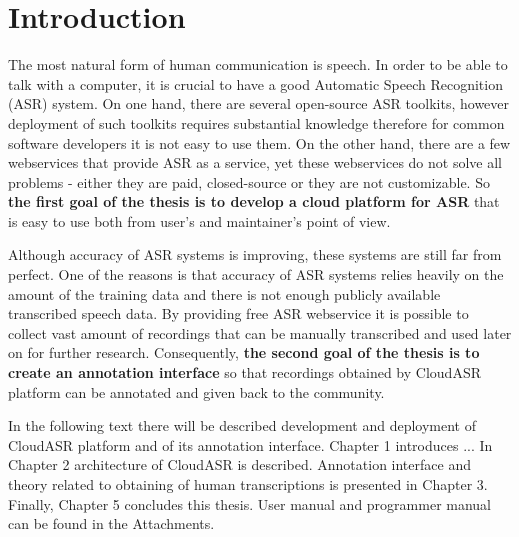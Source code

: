 \chapter*{Introduction}

The most natural form of human communication is speech.
In order to be able to talk with a computer,
  it is crucial to have a good Automatic Speech Recognition (ASR) system.
On one hand, there are several open-source ASR toolkits,
  however deployment of such toolkits requires substantial knowledge therefore
  for common software developers it is not easy to use them.
On the other hand, there are a few webservices that provide ASR as a service,
  yet these webservices do not solve all problems -
  either they are paid, closed-source or they are not customizable.
So \textbf{the first goal of the thesis is to develop a cloud platform for ASR}
  that is easy to use both from user's and maintainer's point of view.

Although accuracy of ASR systems is improving,
  these systems are still far from perfect.
One of the reasons is that accuracy of ASR systems relies heavily on the amount of the training data
  and there is not enough publicly available transcribed speech data.
By providing free ASR webservice it is possible to collect vast amount of recordings
  that can be manually transcribed and used later on for further research.
Consequently, \textbf{the second goal of the thesis is to create an annotation interface}
  so that recordings obtained by CloudASR platform can be annotated and given back to the community.

In the following text there will be described development and deployment of CloudASR platform and of its annotation interface.
Chapter 1 introduces ...
In Chapter 2 architecture of CloudASR is described.
Annotation interface and theory related to obtaining of human transcriptions is presented in Chapter 3.
Finally, Chapter 5 concludes this thesis.
User manual and programmer manual can be found in the Attachments.
